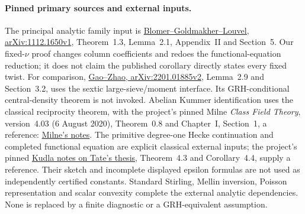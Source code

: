 \paragraph{Pinned primary sources and external inputs.}
The principal analytic family input is
\href{https://arxiv.org/pdf/1112.1650v1}{Blomer--Goldmakher--Louvel,
arXiv:1112.1650v1}, Theorem~1.3, Lemma~2.1, Appendix~II and Section~5.
Our fixed-$\nu$ proof changes column coefficients and redoes the
functional-equation reduction; it does not claim the published
corollary directly states every fixed twist.
For comparison,
\href{https://arxiv.org/pdf/2201.01885v2}{Gao--Zhao,
arXiv:2201.01885v2}, Lemma~2.9 and Section~3.2, uses the sextic
large-sieve/moment interface. Its GRH-conditional central-density theorem
is not invoked. Abelian Kummer identification uses the classical
reciprocity theorem, with the project's pinned Milne \emph{Class Field
Theory}, version~4.03 (6 August 2020), Theorem~0.8 and Chapter~I,
Section~1, a reference:
\href{https://www.jmilne.org/math/CourseNotes/CFT.pdf}{Milne's notes}.
The primitive degree-one Hecke continuation and completed functional
equation are explicit classical external inputs; the project's pinned
\href{https://u.cs.biu.ac.il/~reznikov/courses/kudla-1.pdf}{Kudla notes
on Tate's thesis}, Theorem~4.3 and Corollary~4.4, supply a reference.
Their sketch and incomplete displayed epsilon formulas are not used as
independently certified constants. Standard Stirling, Mellin inversion,
Poisson representation and scalar convexity complete the external
analytic dependencies. None is replaced by a finite diagnostic or a
GRH-equivalent assumption.
